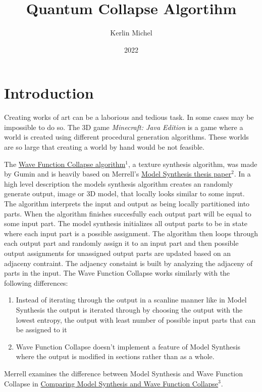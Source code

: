 \documentclass{article}
\begin{document}
\title{Quantum Collapse Algortihm}
\author{Kerlin Michel}
\date{2022}
\maketitle

\listofalgorithms

\section{Introduction}
Creating works of art can be a laborious and tedious task. In some cases may be impossible to do so. The 3D game {\it Minecraft: Java Edition} is a game 
where a world is created using different procedural generation algorithms. These worlds are so large that creating a world by hand would be not feasible.

The \href{https://github.com/mxgmn/WaveFunctionCollapse}{Wave Function Collapse algorithm}$^1$, a texture synthesis algorithm, was made by Gumin
and is heavily based on Merrell's \href{https://paulmerrell.org//thesis.pdf}{Model Synthesis thesis paper}$^2$. In a high level description the models
synthesis algorithm creates an randomly generate output, image or 3D model, that locally looks similar to some input. The algorithm interprets the 
input and output as being locally partitioned into parts. When the algorithm finishes succesfully each output part will be equal to some input part.
The model synthesis initializes all output parts to be in state where each input part is a possible assignment. The algorithm then loops through each output part
and randomly assign it to an input part and then possible output assignments for unassigned output parts are updated based on an adjaceny contraint. The adjaency
constaint is built by analyzing the adjaceny of parts in the input. The Wave Function Collapse works similarly with the following differences:
\begin{enumerate}
    \item Instead of iterating through the output in a scanline manner like in Model Synthesis the output is iterated through by choosing the output with the
          lowest entropy, the output with least number of possible input parts that can be assigned to it
    \item  Wave Function Collapse doesn't implement a feature of Model Synthesis where the output is modified in sections rather than as a whole.
\end{enumerate}
Merrell examines the difference between Model Synthesis and Wave Function Collapse in
\href{https://paulmerrell.org/wp-content/uploads/2021/07/comparison.pdf}{Comparing Model Synthesis and Wave Function Collapse}$^3$.
\end{document}

